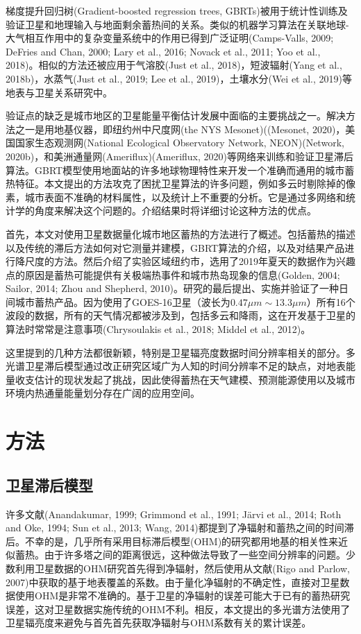 \documentclass[3p,times]{elsarticle}
\begin{document}
梯度提升回归树(Gradient-boosted regression trees, GBRTs)被用于统计性训练及验证卫星和地理输入与地面剩余蓄热间的关系。类似的机器学习算法在关联地球-大气相互作用中的复杂变量系统中的作用已得到广泛证明(Camps-Valls, 2009; DeFries and Chan, 2000; Lary et al., 2016; Novack et al., 2011; Yoo et al., 2018)。相似的方法还被应用于气溶胶(Just et al., 2018)，短波辐射(Yang et al., 2018b)，水蒸气(Just et al., 2019; Lee et al., 2019)，土壤水分(Wei et al., 2019)等地表与卫星关系研究中。

验证点的缺乏是城市地区的卫星能量平衡估计发展中面临的主要挑战之一。解决方法之一是用地基仪器，即纽约州中尺度网(the NYS Mesonet)((Mesonet, 2020)，美国国家生态观测网(National Ecological Observatory Network, NEON)(Network, 2020b)，和美洲通量网(Ameriflux)(Ameriflux, 2020)等网络来训练和验证卫星滞后算法。GBRT模型使用地面站的许多地球物理特性来开发一个准确而通用的城市蓄热特征。本文提出的方法攻克了困扰卫星算法的许多问题，例如多云时剔除掉的像素，城市表面不准确的材料属性，以及统计上不重要的分析。它是通过多网络和统计学的角度来解决这个问题的。介绍结果时将详细讨论这种方法的优点。

首先，本文对使用卫星数据量化城市地区蓄热的方法进行了概述。包括蓄热的描述以及传统的滞后方法如何对它测量并建模，GBRT算法的介绍，以及对结果产品进行降尺度的方法。然后介绍了实验区域纽约市，选用了2019年夏天的数据作为兴趣点的原因是蓄热可能提供有关极端热事件和城市热岛现象的信息(Golden, 2004; Sailor, 2014; Zhou and Shepherd, 2010)。研究的最后提出、实施并验证了一种日间城市蓄热产品。因为使用了GOES-16卫星（波长为$0.47\mu m\sim13.3\mu m$）所有16个波段的数据，所有的天气情况都被涉及到，包括多云和降雨，这在开发基于卫星的算法时常常是注意事项(Chrysoulakis et al., 2018; Middel et al., 2012)。

这里提到的几种方法都很新颖，特别是卫星辐亮度数据时间分辨率相关的部分。多光谱卫星滞后模型通过改正研究区域广为人知的时间分辨率不足的缺点，对地表能量收支估计的现状发起了挑战，因此使得蓄热在天气建模、预测能源使用以及城市环境内热通量能量划分存在广阔的应用空间。

\section{方法}

\subsection{卫星滞后模型}

许多文献(Anandakumar, 1999; Grimmond et al., 1991; Järvi et al., 2014; Roth and Oke, 1994; Sun et al., 2013; Wang, 2014)都提到了净辐射和蓄热之间的时间滞后。不幸的是，几乎所有采用目标滞后模型(OHM)的研究都用地基的相关性来近似蓄热。由于许多塔之间的距离很远，这种做法导致了一些空间分辨率的问题。少数利用卫星数据的OHM研究首先得到净辐射，然后使用从文献(Rigo and Parlow, 2007)中获取的基于地表覆盖的系数。由于量化净辐射的不确定性，直接对卫星数据使用OHM是非常不准确的。基于卫星的净辐射的误差可能大于已有的蓄热研究误差，这对卫星数据实施传统的OHM不利。相反，本文提出的多光谱方法使用了卫星辐亮度来避免与首先首先获取净辐射与OHM系数有关的累计误差。
\end{document}
